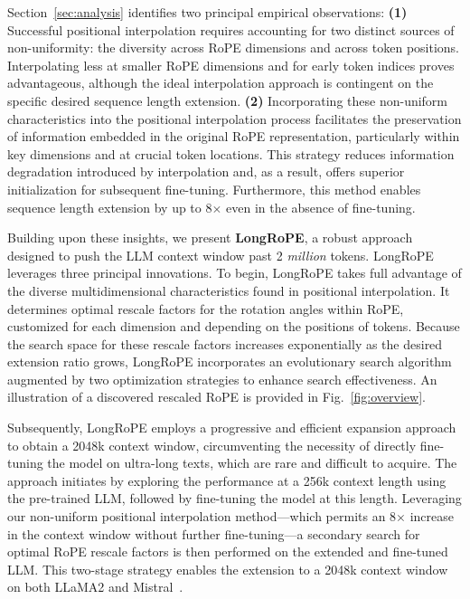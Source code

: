 Section~\ref{sec:analysis} identifies two principal empirical observations: \textbf{(1)} Successful positional interpolation requires accounting for two distinct sources of non-uniformity: the diversity across RoPE dimensions and across token positions. Interpolating less at smaller RoPE dimensions and for early token indices proves advantageous, although the ideal interpolation approach is contingent on the specific desired sequence length extension.
  \textbf{(2)} Incorporating these non-uniform characteristics into the positional interpolation process facilitates the preservation of information embedded in the original RoPE representation, particularly within key dimensions and at crucial token locations. This strategy reduces information degradation introduced by interpolation and, as a result, offers superior initialization for subsequent fine-tuning. Furthermore, this method enables sequence length extension by up to 8$\times$ even in the absence of fine-tuning.

Building upon these insights, we present \textbf{LongRoPE}, a robust approach designed to push the LLM context window past 2 \emph{million} tokens. LongRoPE leverages three principal innovations. To begin, {LongRoPE} takes full advantage of the diverse multidimensional characteristics found in positional interpolation. It determines optimal rescale factors for the rotation angles within RoPE, customized for each dimension and depending on the positions of tokens. Because the search space for these rescale factors increases exponentially as the desired extension ratio grows, {LongRoPE} incorporates an evolutionary search algorithm augmented by two optimization strategies to enhance search effectiveness. An illustration of a discovered rescaled RoPE is provided in Fig.~\ref{fig:overview}.

Subsequently, {LongRoPE} employs a progressive and efficient expansion approach to obtain a 2048k context window, circumventing the necessity of directly fine-tuning the model on ultra-long texts, which are rare and difficult to acquire. The approach initiates by exploring the performance at a 256k context length using the pre-trained LLM, followed by fine-tuning the model at this length. Leveraging our non-uniform positional interpolation method—which permits an 8$\times$ increase in the context window without further fine-tuning—a secondary search for optimal RoPE rescale factors is then performed on the extended and fine-tuned LLM. This two-stage strategy enables the extension to a 2048k context window on both LLaMA2 and Mistral~\cite{mistral}.

